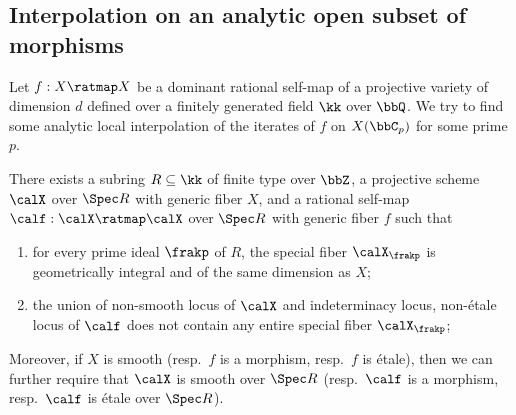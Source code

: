 \subsection{Interpolation on an analytic open subset of morphisms}

    Let \(f: X \ratmap X\) be a dominant rational self-map of a projective variety of dimension \(d\) defined over a finitely generated field \(\kk\) over \(\bbQ\).
    We try to find some analytic local interpolation of the iterates of \(f\) on \(X(\bbC_p)\) for some prime \(p\).

    \begin{lemma}\label{lem:existence_of_good_model_for_smooth_things}
        There exists a subring \(R \subseteq \kk\) of finite type over \(\bbZ\),
        a projective scheme \(\calX\) over \(\Spec R\) with generic fiber \(X\),
        and a rational self-map \(\calf: \calX \ratmap \calX\) over \(\Spec R\) with generic fiber \(f\)
        such that
        \begin{enumerate}
            \item for every prime ideal \(\frakp\) of \(R\), the special fiber \(\calX_{\frakp}\) is geometrically integral and of the same dimension as \(X\);
            \item the union of non-smooth locus of \(\calX\) and indeterminacy locus, non-\'etale locus of \(\calf\) does not contain any entire special fiber \(\calX_{\frakp}\);
        \end{enumerate}

        Moreover, if \(X\) is smooth (resp.\ \(f\) is a morphism, resp.\ \(f\) is \'etale), then we can further require that \(\calX\) is smooth over \(\Spec R\) (resp.\ \(\calf\) is a morphism, resp.\ \(\calf\) is \'etale over \(\Spec R\)).
    \end{lemma}




